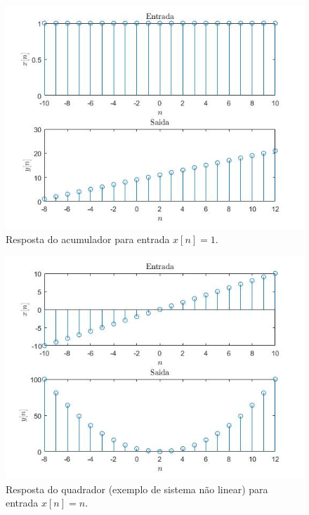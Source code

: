 \documentclass[a4paper, 12pt]{article}
\begin{document}
\begin{figure}[H]
	\centering
	\includegraphics[scale=0.7]{img2.jpg} 
	\caption{Resposta do acumulador para entrada $x[n] = 1$.}
	\label{fig:1a}
\end{figure}

\begin{figure}[H]
	\centering
	\includegraphics[scale=0.7]{img3.jpg} 
	\caption{Resposta do quadrador (exemplo de sistema não linear) para entrada $x[n] = n$.}
	\label{fig:1a}
\end{figure}
\end{document}
